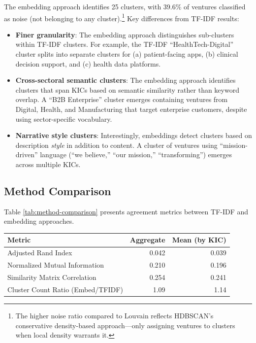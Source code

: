 \documentclass[../main.tex]{subfiles}
\begin{document}
The embedding approach identifies 25 clusters, with 39.6\% of ventures classified as noise (not belonging to any cluster).\footnote{The higher noise ratio compared to Louvain reflects HDBSCAN's conservative density-based approach---only assigning ventures to clusters when local density warrants it.} Key differences from TF-IDF results:

\begin{itemize}
    \item \textbf{Finer granularity}: The embedding approach distinguishes sub-clusters within TF-IDF clusters. For example, the TF-IDF ``HealthTech-Digital'' cluster splits into separate clusters for (a) patient-facing apps, (b) clinical decision support, and (c) health data platforms.

    \item \textbf{Cross-sectoral semantic clusters}: The embedding approach identifies clusters that span KICs based on semantic similarity rather than keyword overlap. A ``B2B Enterprise'' cluster emerges containing ventures from Digital, Health, and Manufacturing that target enterprise customers, despite using sector-specific vocabulary.

    \item \textbf{Narrative style clusters}: Interestingly, embeddings detect clusters based on description \textit{style} in addition to content. A cluster of ventures using ``mission-driven'' language (``we believe,'' ``our mission,'' ``transforming'') emerges across multiple KICs.
\end{itemize}

\subsection{Method Comparison}

Table \ref{tab:method-comparison} presents agreement metrics between TF-IDF and embedding approaches.

\begin{center}
\small
\begin{tabular}{lrr}
\toprule
\textbf{Metric} & \textbf{Aggregate} & \textbf{Mean (by KIC)} \\
\midrule
Adjusted Rand Index & 0.042 & 0.039 \\
Normalized Mutual Information & 0.210 & 0.196 \\
Similarity Matrix Correlation & 0.254 & 0.241 \\
Cluster Count Ratio (Embed/TFIDF) & 1.09 & 1.14 \\
\bottomrule
\end{tabular}
\end{center}
\end{document}
